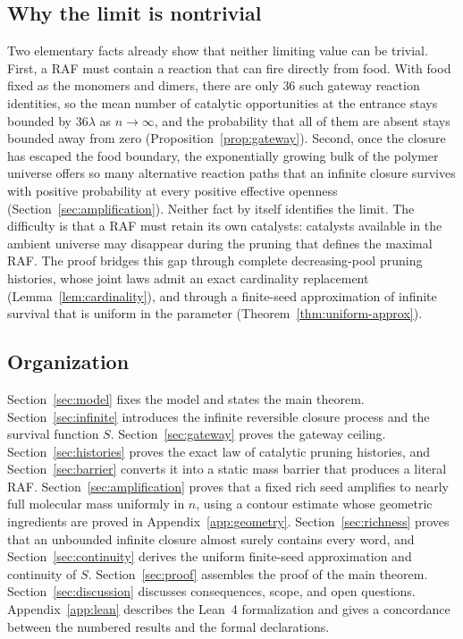 \documentclass[11pt,reqno]{amsart}
\theoremstyle{plain}
\theoremstyle{definition}
\theoremstyle{remark}
\numberwithin{equation}{section}
\begin{document}
\subsection*{Why the limit is nontrivial}
Two elementary facts already show that neither limiting value can be trivial. First, a RAF must contain a reaction that can fire directly from food. With food fixed as the monomers and dimers, there are only $36$ such gateway reaction identities, so the mean number of catalytic opportunities at the entrance stays bounded by $36\lambda$ as $n\to\infty$, and the probability that all of them are absent stays bounded away from zero (Proposition~\ref{prop:gateway}). Second, once the closure has escaped the food boundary, the exponentially growing bulk of the polymer universe offers so many alternative reaction paths that an infinite closure survives with positive probability at every positive effective openness (Section~\ref{sec:amplification}). Neither fact by itself identifies the limit. The difficulty is that a RAF must retain its own catalysts: catalysts available in the ambient universe may disappear during the pruning that defines the maximal RAF. The proof bridges this gap through complete decreasing-pool pruning histories, whose joint laws admit an exact cardinality replacement (Lemma~\ref{lem:cardinality}), and through a finite-seed approximation of infinite survival that is uniform in the parameter (Theorem~\ref{thm:uniform-approx}).

\subsection*{Organization}
Section~\ref{sec:model} fixes the model and states the main theorem. Section~\ref{sec:infinite} introduces the infinite reversible closure process and the survival function $S$. Section~\ref{sec:gateway} proves the gateway ceiling. Section~\ref{sec:histories} proves the exact law of catalytic pruning histories, and Section~\ref{sec:barrier} converts it into a static mass barrier that produces a literal RAF. Section~\ref{sec:amplification} proves that a fixed rich seed amplifies to nearly full molecular mass uniformly in $n$, using a contour estimate whose geometric ingredients are proved in Appendix~\ref{app:geometry}. Section~\ref{sec:richness} proves that an unbounded infinite closure almost surely contains every word, and Section~\ref{sec:continuity} derives the uniform finite-seed approximation and continuity of $S$. Section~\ref{sec:proof} assembles the proof of the main theorem. Section~\ref{sec:discussion} discusses consequences, scope, and open questions. Appendix~\ref{app:lean} describes the Lean~4 formalization and gives a concordance between the numbered results and the formal declarations.
\end{document}
